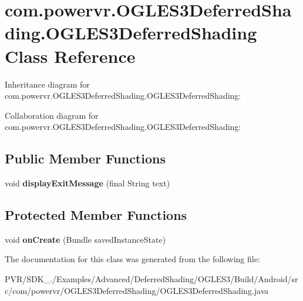 \hypertarget{classcom_1_1powervr_1_1_o_g_l_e_s3_deferred_shading_1_1_o_g_l_e_s3_deferred_shading}{\section{com.\+powervr.\+O\+G\+L\+E\+S3\+Deferred\+Shading.\+O\+G\+L\+E\+S3\+Deferred\+Shading Class Reference}
\label{classcom_1_1powervr_1_1_o_g_l_e_s3_deferred_shading_1_1_o_g_l_e_s3_deferred_shading}
}


Inheritance diagram for com.\+powervr.\+O\+G\+L\+E\+S3\+Deferred\+Shading.\+O\+G\+L\+E\+S3\+Deferred\+Shading\+:


Collaboration diagram for com.\+powervr.\+O\+G\+L\+E\+S3\+Deferred\+Shading.\+O\+G\+L\+E\+S3\+Deferred\+Shading\+:
\subsection*{Public Member Functions}
\begin{DoxyCompactItemize}
\item 
\hypertarget{classcom_1_1powervr_1_1_o_g_l_e_s3_deferred_shading_1_1_o_g_l_e_s3_deferred_shading_a6bd6668e8b0514c211c8f093bb8b0694}{void {\bfseries display\+Exit\+Message} (final String text)}\label{classcom_1_1powervr_1_1_o_g_l_e_s3_deferred_shading_1_1_o_g_l_e_s3_deferred_shading_a6bd6668e8b0514c211c8f093bb8b0694}

\end{DoxyCompactItemize}
\subsection*{Protected Member Functions}
\begin{DoxyCompactItemize}
\item 
\hypertarget{classcom_1_1powervr_1_1_o_g_l_e_s3_deferred_shading_1_1_o_g_l_e_s3_deferred_shading_a434d731664ce5d9ea5292adaef619568}{void {\bfseries on\+Create} (Bundle saved\+Instance\+State)}\label{classcom_1_1powervr_1_1_o_g_l_e_s3_deferred_shading_1_1_o_g_l_e_s3_deferred_shading_a434d731664ce5d9ea5292adaef619568}

\end{DoxyCompactItemize}


The documentation for this class was generated from the following file\+:\begin{DoxyCompactItemize}
\item 
P\+V\+R/\+S\+D\+K\+\_./\+Examples/\+Advanced/\+Deferred\+Shading/\+O\+G\+L\+E\+S3/\+Build/\+Android/src/com/powervr/\+O\+G\+L\+E\+S3\+Deferred\+Shading/O\+G\+L\+E\+S3\+Deferred\+Shading.\+java\end{DoxyCompactItemize}
